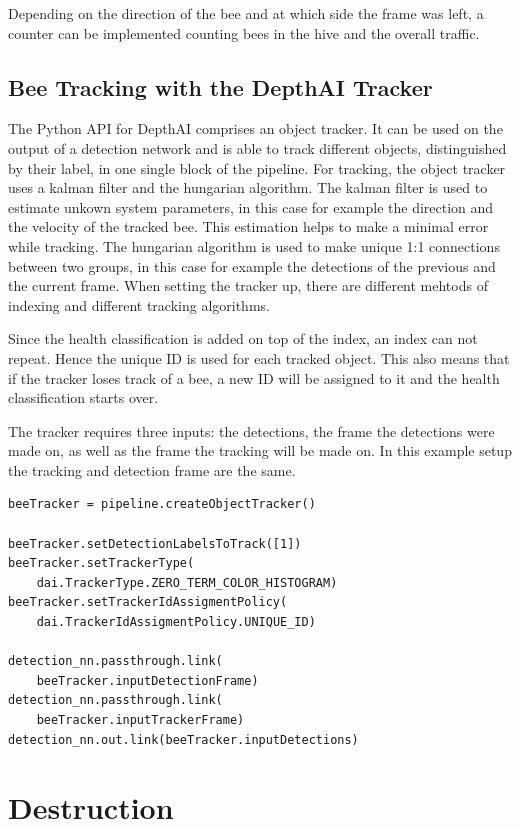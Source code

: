 \documentclass[a4paper,titlepage]{article}
\begin{document}
Depending on the direction of the bee and at which side the frame was left, a counter can be implemented counting bees in the hive and the overall traffic.

\newpage
\subsection{Bee Tracking with the DepthAI Tracker}

The Python API for DepthAI comprises an object tracker.
It can be used on the output of a detection network and is able to track different objects, distinguished by their label, in one single block of the pipeline.
For tracking, the object tracker uses a kalman filter and the hungarian algorithm.
The kalman filter is used to estimate unkown system parameters, in this case for example the direction and the velocity of the tracked bee.
This estimation helps to make a minimal error while tracking.
The hungarian algorithm is used to make unique 1:1 connections between two groups, in this case for example the detections of the previous and the current frame.
When setting the tracker up, there are different mehtods of indexing and different tracking algorithms.

Since the health classification is added on top of the index, an index can not repeat.
Hence the unique ID is used for each tracked object.
This also means that if the tracker loses track of a bee, a new ID will be assigned to it and the health classification starts over.

The tracker requires three inputs: the detections, the frame the detections were made on, as well as the frame the tracking will be made on.
In this example setup the tracking and detection frame are the same.

\begin{lstlisting}
beeTracker = pipeline.createObjectTracker()

beeTracker.setDetectionLabelsToTrack([1])
beeTracker.setTrackerType(
    dai.TrackerType.ZERO_TERM_COLOR_HISTOGRAM)
beeTracker.setTrackerIdAssigmentPolicy(
    dai.TrackerIdAssigmentPolicy.UNIQUE_ID)

detection_nn.passthrough.link(
    beeTracker.inputDetectionFrame)
detection_nn.passthrough.link(
    beeTracker.inputTrackerFrame)
detection_nn.out.link(beeTracker.inputDetections)
\end{lstlisting}

\newpage
\section{Destruction}
\end{document}
